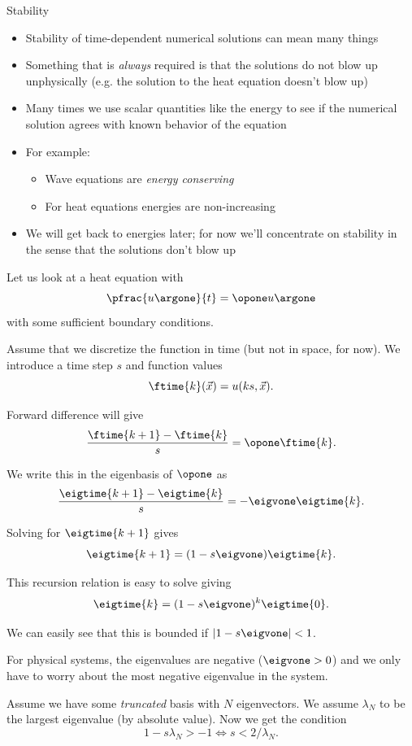 \begin{frame}{Stability}
	\begin{itemize}[<+->]
		\item Stability of time-dependent numerical solutions can mean many things
		\item Something that is \emph{always} required is that the solutions do not blow up unphysically (e.g. the solution to the heat equation doesn't blow up)
		\item Many times we use scalar quantities like the energy to see if the numerical solution agrees with known behavior of the equation
		\item For example:
		\begin{itemize}
			\item Wave equations are \emph{energy conserving} 
			\item For heat equations energies are non-increasing
		\end{itemize}
		\item We will get back to energies later; for now we'll concentrate on stability in the sense that the solutions don't blow up
	\end{itemize}
\end{frame}

\begin{frame}
	Let us look at a heat equation with 
	\[ \pfrac{u\argone}{t} = \opone u\argone \]
	with some sufficient boundary conditions.
	
	\pause
	Assume that we discretize the function in time (but not in space, for now). We introduce a time step $ s $ and function values \[ \ftime{k} (\vec{x}) = u(ks,\vec{x}). \] 
	
	\pause
	Forward difference will give
	\[ \frac{\ftime{k+1}-\ftime{k}}{s} = \opone \ftime{k}. \]
	
\end{frame}

\begin{frame}
	We write this in the eigenbasis of $ \opone $ as 
	\[ \frac{\eigtime{k+1}-\eigtime{k}}{s} = -\eigvone \eigtime{k}. \]
	
	\pause
	Solving for $ \eigtime{k+1} $ gives
	\[ \eigtime{k+1} = (1 - s \eigvone) \eigtime{k}. \]
	
	\pause
	This recursion relation is easy to solve giving
	\[ \eigtime{k} = (1 - s \eigvone)^{k} \eigtime{0}. \]
	
	\pause
	We can easily see that this is bounded if $ |1 - s \eigvone| < 1 $. 
	
	\pause
	For physical systems, the eigenvalues are negative ($ \eigvone > 0 $) and we only have to worry about the most negative eigenvalue in the system. 
	
	\pause
	Assume we have some \emph{truncated} basis with $ N $ eigenvectors. We assume $ \lambda_N $ to be the largest eigenvalue (by absolute value). Now we get the condition
	\[ 1 - s \lambda_N > -1  \Leftrightarrow s < 2/\lambda_N. \]
\end{frame}

